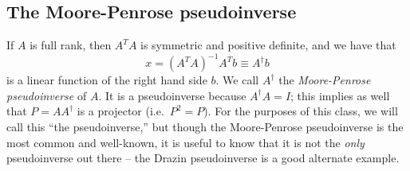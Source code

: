 \subsection{The Moore-Penrose pseudoinverse}

If $A$ is full rank, then $A^T A$ is symmetric and positive definite,
and we have that
\[
  x = (A^T A)^{-1} A^T b \equiv A^\dagger b
\]
is a linear function of the right hand side $b$.  We call $A^\dagger$
the {\em Moore-Penrose pseudoinverse} of $A$.  It is a pseudoinverse
because $A^\dagger A = I$; this implies as well that $P = A A^\dagger$
is a projector (i.e.~$P^2 = P$).  For the purposes of this class, we
will call this ``the pseudoinverse,'' but though the Moore-Penrose
pseudoinverse is the most common and well-known, it is useful to know
that it is not the {\em only} pseudoinverse out there -- the Drazin
pseudoinverse is a good alternate example.
